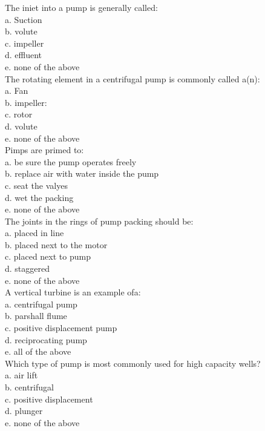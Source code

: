 The iniet into a pump is generally called:\\
a. Suction\\
b. volute\\
c. impeller\\
d. effluent\\
e. none of the above\\

The rotating element in a centrifugal pump is commonly called a(n):\\
a. Fan\\
b. impeller:\\
c. rotor\\
d. volute\\
e. none of the above\\

Pimps are primed to:\\
a. be sure the pump operates freely\\
b. replace air with water inside the pump\\
c. seat the valyes\\
d. wet the packing\\
e. none of the above\\

The joints in the rings of pump packing should be:\\
a. placed in line\\
b. placed next to the motor\\
c. placed next to pump\\
d. staggered\\
e. none of the above\\

A vertical turbine is an example ofa:\\
a. centrifugal pump\\
b. parshall flume\\
c. positive displacement pump\\
d. reciprocating pump\\
e. all of the above\\

Which type of pump is most commonly used for high capacity wells?\\
a. air lift\\
b. centrifugal\\
c. positive displacement\\
d. plunger\\
e. none of the above\\

